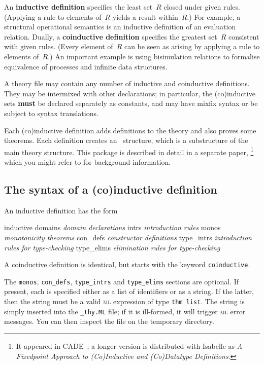 An {\bf inductive definition} specifies the least set~$R$ closed under given
rules.  (Applying a rule to elements of~$R$ yields a result within~$R$.)  For
example, a structural operational semantics is an inductive definition of an
evaluation relation.  Dually, a {\bf coinductive definition} specifies the
greatest set~$R$ consistent with given rules.  (Every element of~$R$ can be
seen as arising by applying a rule to elements of~$R$.)  An important example
is using bisimulation relations to formalise equivalence of processes and
infinite data structures.

A theory file may contain any number of inductive and coinductive
definitions.  They may be intermixed with other declarations; in
particular, the (co)inductive sets {\bf must} be declared separately as
constants, and may have mixfix syntax or be subject to syntax translations.

Each (co)inductive definition adds definitions to the theory and also
proves some theorems.  Each definition creates an \ML\ structure, which is a
substructure of the main theory structure.
This package is described in detail in a separate paper,%
\footnote{It appeared in CADE~\cite{paulson-CADE}; a longer version is
  distributed with Isabelle as \emph{A Fixedpoint Approach to 
 (Co)Inductive and (Co)Datatype Definitions}.}  %
which you might refer to for background information.


\subsection{The syntax of a (co)inductive definition}
An inductive definition has the form
\begin{ttbox}
inductive
  domains    {\it domain declarations}
  intrs      {\it introduction rules}
  monos      {\it monotonicity theorems}
  con_defs   {\it constructor definitions}
  type_intrs {\it introduction rules for type-checking}
  type_elims {\it elimination rules for type-checking}
\end{ttbox}
A coinductive definition is identical, but starts with the keyword
{\tt coinductive}.  

The {\tt monos}, {\tt con\_defs}, {\tt type\_intrs} and {\tt type\_elims}
sections are optional.  If present, each is specified either as a list of
identifiers or as a string.  If the latter, then the string must be a valid
\textsc{ml} expression of type {\tt thm list}.  The string is simply inserted
into the {\tt _thy.ML} file; if it is ill-formed, it will trigger \textsc{ml}
error messages.  You can then inspect the file on the temporary directory.

